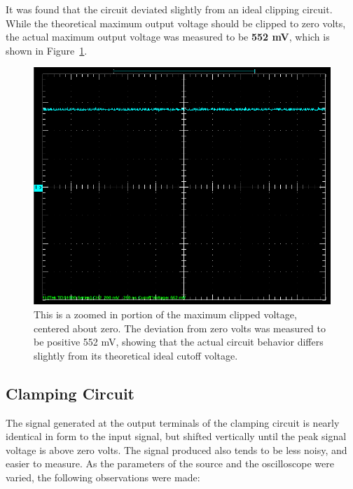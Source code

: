 \documentclass[twocolumn,english]{IEEEtran}
\begin{document}
It was found that the circuit deviated slightly from an ideal clipping circuit. While the theoretical maximum output voltage should be clipped to zero volts, the actual maximum output voltage was measured to be \textbf{552 mV}, which is shown in Figure~\ref{fig:cutoff_voltage}.
\begin{figure}[h]
  \begin{centering}
  \begin{center}
  \includegraphics[width=\linewidth]{./Images/Cutoff_Voltage.png}
  \caption{This is a zoomed in portion of the maximum clipped voltage, centered about zero. The deviation from zero volts was measured to be positive 552 mV, showing that the actual circuit behavior differs slightly from its theoretical ideal cutoff voltage.}
  \label{fig:cutoff_voltage}
  \end{center}
  \par\end{centering}
\end{figure}

\noindent\hrulefill
\subsection{\textbf{Clamping Circuit}}
The signal generated at the output terminals of the clamping circuit is nearly identical in form to the input signal, but shifted vertically until the peak signal voltage is above zero volts. The signal produced also tends to be less noisy, and easier to measure. As the parameters of the source and the oscilloscope were varied, the following observations were made:
\end{document}
